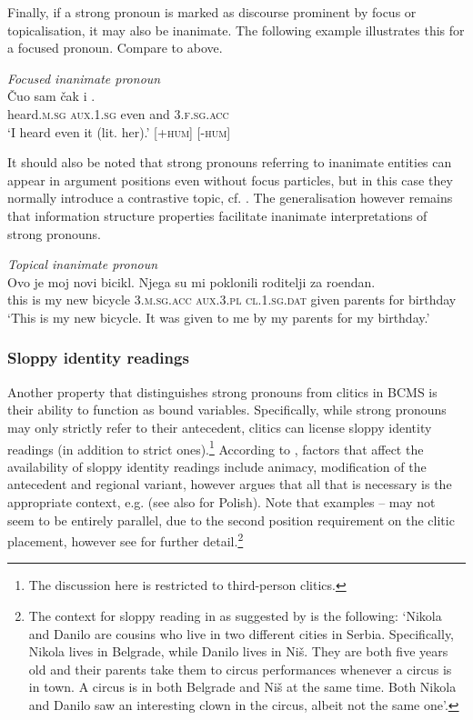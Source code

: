 \documentclass[output=paper,colorlinks,citecolor=brown]{langscibook}
\begin{document}
\noindent Finally, if a strong pronoun is marked as discourse prominent by focus or topicalisation, it may also be inanimate. The following example illustrates this for a focused pronoun. Compare  to  above. 

\ea \label{focus1} \textit{Focused inanimate pronoun \citep[246]{despic11}}\\
\gll Čuo sam čak i . \\
heard.\textsc{m.sg} \textsc{aux.1.sg} even and \textsc{3.f.sg.acc}\\
\glt `I heard even it (lit. her).' \hfill [+\textsc{hum}] [-\textsc{hum}]
\z

\noindent It should also be noted that strong pronouns referring to inanimate entities can appear in argument positions even without focus particles, but in this case they normally introduce a contrastive topic, cf. . The generalisation however remains that information structure properties facilitate inanimate interpretations of strong pronouns. 

\ea \label{topicalinanimate} \textit{Topical inanimate pronoun}\\
\gll Ovo je moj novi bicikl. Njega su mi poklonili roditelji za ro\dj{}endan.\\
this is my new bicycle \textsc{3.m.sg.acc} \textsc{aux.3.pl} \textsc{cl.1.sg.dat} given parents for birthday\\
\glt `This is my new bicycle. It was given to me by my parents for my birthday.'
\z

\subsubsection{Sloppy identity readings}\label{subsubsec:sloppyreadings}

Another property that distinguishes strong pronouns from clitics in BCMS is their ability to function as bound variables. Specifically, while strong pronouns may only strictly refer to their antecedent, clitics can license sloppy identity readings (in addition to strict ones).\footnote{The discussion here is restricted to third-person clitics.} According to \citet{franks13}, factors that affect the availability of sloppy identity readings include animacy, modification of the antecedent and regional variant, however \citet{runic14} argues that all that is necessary is the appropriate context, e.g.  (see also \citealt{ruda21pronounstructure,ruda21sloppy} for Polish). Note that examples -- may not seem to be entirely parallel, due to the second position requirement on the clitic placement, however see  for further detail.\footnote{The context for sloppy reading in  as suggested by \citet[123]{runic14} is the following: `Nikola and Danilo are cousins who live in two different cities in Serbia. Specifically, Nikola lives in Belgrade, while Danilo lives in Niš. They are both five years old and their parents take them to circus performances whenever a circus is in town. A circus is in both Belgrade and Niš at the same time. Both Nikola and Danilo saw an interesting clown in the circus, albeit not the same one'.}
\end{document}
